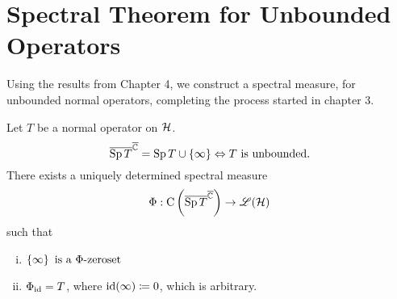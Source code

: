 \section{Spectral Theorem for Unbounded Operators}

Using the results from Chapter 4, we construct a spectral measure,
for unbounded normal operators, completing the process started in chapter
3. 
\begin{thrm}
 Let $T$ be a normal operator on $\mathcal{H}$.
 \[ 
 \overline{\operatorname{Sp} T}^{\overline{\mathbb{C}}} = \operatorname{Sp} T \cup \left\lbrace \infty \right\rbrace \Leftrightarrow T
 \text{ is unbounded.}
 \]
 There exists a uniquely determined spectral measure
 \[
  \Phi : \operatorname{C}\left( \overline{\operatorname{Sp} T }^{\overline{\mathbb{C}}} \right) \to \mathscr{L}(\mathcal{H})
 \]
 such that
 \begin{enumerate}[(i)]
  \item $
         \left\lbrace \infty \right\rbrace \text{ is a } \Phi\text{-zeroset}
        $
        
       
  \item $\Phi_{\operatorname{id}} = T$, where $\operatorname{id}(\infty) \coloneqq 0$, which is arbitrary.

  
 \end{enumerate}

\end{thrm}

